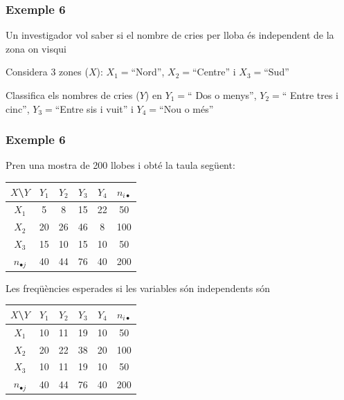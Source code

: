 \documentclass[12pt,t]{beamer}
\theoremstyle{plain}
\theoremstyle{definition}
\begin{document}
\begin{frame}
\frametitle{Exemple 6}
Un investigador vol saber si el nombre de cries per lloba és independent de la zona on visqui
\medskip

Considera 3 zones ($X$): $X_1=$``Nord'', $X_2=$``Centre'' i  $X_3=$``Sud''
\medskip

Classifica els nombres de cries ($Y$) en
$Y_1=$`` Dos o menys'', $Y_2=$`` Entre tres i cinc'',  $Y_3=$``Entre sis i vuit'' i  $Y_4=$``Nou o
més''
\end{frame}






\begin{frame}
\frametitle{Exemple 6}

Pren una mostra de 200 llobes i obté la taula següent:
\begin{center}
\begin{tabular}{|c|cccc|c|}
\hline
$X$\textbackslash $Y$ & $Y_1$ & $Y_2$ & $Y_3$ & $Y_4$ & $n_{i\bullet}$\\ \hline
$X_1$ & 5   & 8   & 15  & 22   & 50 \\
$X_2$ & 20 &26  &46   & 8  & 100\\
$X_3$ & 15  & 10  & 15   & 10   & 50 \\
\hline
$n_{\bullet j}$ & 40 & 44 & 76 & 40 & 200 \\ \hline
\end{tabular}
\end{center}
\pause
Les freqüències esperades si les variables són independents són
\begin{center}
\begin{tabular}{|c|cccc|c|}
\hline
$X$\textbackslash $Y$ & $Y_1$ & $Y_2$ & $Y_3$ & $Y_4$ & $n_{i\bullet}$\\ \hline
$X_1$ &  10 &  11 &  19 &  10 & 50 \\
$X_2$ &  20 & 22 & 38 &  20 & 100\\
$X_3$ &  10 &  11 &  19 &  10 & 50 \\
\hline
$n_{\bullet j}$ & 40 & 44 & 76 & 40 & 200 \\ \hline
\end{tabular}
\end{center}

\end{frame}
\end{document}
